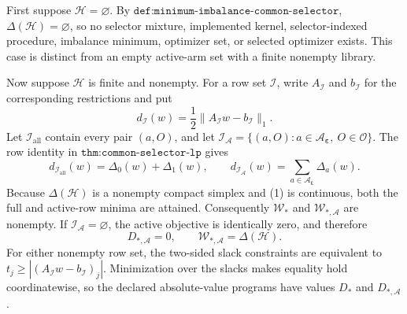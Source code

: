 First suppose \(\mathcal H=\varnothing\). By \(\texttt{def:minimum-imbalance-common-selector}\), \(\Delta(\mathcal H)=\varnothing\), so no selector mixture, implemented kernel, selector-indexed procedure, imbalance minimum, optimizer set, or selected optimizer exists. This case is distinct from an empty active-arm set with a finite nonempty library.

Now suppose \(\mathcal H\) is finite and nonempty. For a row set \(\mathcal I\), write \(A_{\mathcal I}\) and \(b_{\mathcal I}\) for the corresponding restrictions and put
\[
d_{\mathcal I}(w)=\frac12\lVert A_{\mathcal I}w-b_{\mathcal I}\rVert_1.
\tag{1}
\]
Let \(\mathcal I_{\mathrm{all}}\) contain every pair \((a,O)\), and let \(\mathcal I_{\mathcal A}=\{(a,O):a\in\mathcal A_{\boldsymbol\varepsilon},\ O\in\mathcal O\}\). The row identity in \(\texttt{thm:common-selector-lp}\) gives
\[
d_{\mathcal I_{\mathrm{all}}}(w)=\Delta_0(w)+\Delta_1(w),\qquad d_{\mathcal I_{\mathcal A}}(w)=\sum_{a\in\mathcal A_{\boldsymbol\varepsilon}}\Delta_a(w).
\tag{2}
\]
Because \(\Delta(\mathcal H)\) is a nonempty compact simplex and (1) is continuous, both the full and active-row minima are attained. Consequently \(\mathcal W_*\) and \(\mathcal W_{*,\mathcal A}\) are nonempty. If \(\mathcal I_{\mathcal A}=\varnothing\), the active objective is identically zero, and therefore
\[
D_{*,\mathcal A}=0,\qquad \mathcal W_{*,\mathcal A}=\Delta(\mathcal H).
\tag{3}
\]
For either nonempty row set, the two-sided slack constraints are equivalent to \(t_j\ge |(A_{\mathcal I}w-b_{\mathcal I})_j|\). Minimization over the slacks makes equality hold coordinatewise, so the declared absolute-value programs have values \(D_*\) and \(D_{*,\mathcal A}\).

